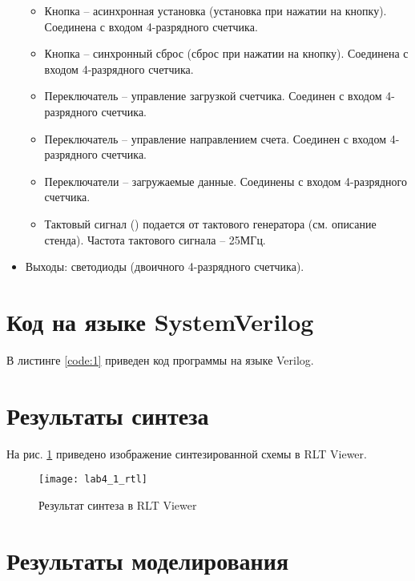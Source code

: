 \begin{itemize}
\begin{itemize}
			\item Кнопка  -- асинхронная установка (установка при нажатии на кнопку). Соединена с входом  4-разрядного счетчика.
			\item Кнопка  -- синхронный сброс (сброс при нажатии на кнопку). Соединена с входом  4-разрядного счетчика.
			\item Переключатель  -- управление загрузкой счетчика. Соединен с входом  4-разрядного счетчика.
			\item Переключатель  -- управление направлением счета. Соединен с входом  4-разрядного счетчика.
			\item Переключатели  -- загружаемые данные. Соединены с входом  4-разрядного счетчика.
			\item Тактовый сигнал () подается от тактового генератора (см. описание стенда). Частота тактового сигнала – 25МГц.
		\end{itemize}
	\item Выходы: светодиоды  (двоичного 4-разрядного счетчика).
\end{itemize}

\section{Код на языке SystemVerilog}

В листинге \ref{code:1} приведен код программы на языке Verilog.



\newpage

\section{Результаты синтеза}

На рис. \ref{fig:lab4_1_rtl} приведено изображение синтезированной схемы в RLT Viewer.

\begin{figure}[H]
\begin{center}
	\texttt{[image: lab4\_1\_rtl]}
	\caption{Результат синтеза в RLT Viewer}
	\label{fig:lab4_1_rtl}
\end{center}
\end{figure}

\section{Результаты моделирования}
\label{sec:lab4_1_modeling}

